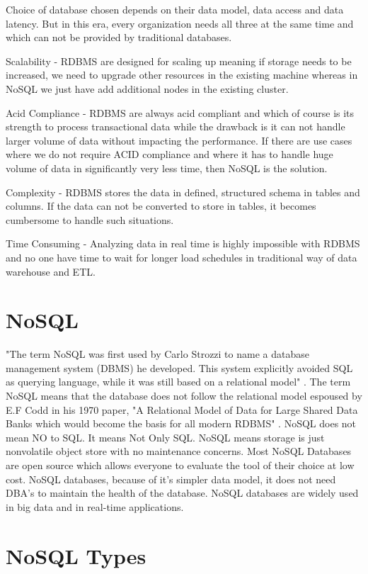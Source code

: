 \documentclass[sigconf]{acmart}
\begin{document}
Choice of database chosen depends on their data model, data access and data latency. But in this era, every organization needs all three at the same time and which can not be provided by traditional databases.

Scalability - RDBMS are designed for scaling up meaning if storage needs to be increased, we need to upgrade other resources in the existing machine whereas in NoSQL we just have add additional nodes in the existing cluster. 

Acid Compliance - RDBMS are always acid compliant and which of course is its strength to process transactional data while the drawback is it can not handle larger volume of data without impacting the performance. If there are use cases where we do not require ACID compliance and  where it has to handle huge volume of data in significantly very less time, then NoSQL is the solution.

Complexity - RDBMS stores the data in defined, structured schema in tables and columns. If the data can not be converted to store in tables, it becomes cumbersome to handle such situations. 

Time Consuming - Analyzing data in real time is highly impossible with RDBMS and no one have time to wait for longer load schedules in traditional way of data warehouse and ETL.

\section{NoSQL}

"The term NoSQL was first used by Carlo Strozzi to name a database management system (DBMS) he developed. This system explicitly avoided SQL as querying language, while it was still based on a relational model" \cite{seasupenn}. The term NoSQL means that the database does not follow the relational model espoused by E.F Codd in his 1970 paper, "A Relational Model of Data for Large Shared Data Banks which would become the basis for all modern RDBMS" \cite{rdbms}. NoSQL does not mean NO to SQL. It means Not Only SQL. NoSQL means storage is just nonvolatile object store with no maintenance concerns. Most NoSQL Databases are open source which allows everyone to evaluate the tool of their choice at low cost. NoSQL databases, because of it's simpler data model, it does not need DBA's to maintain the health of the database. NoSQL databases are widely used in big data and in real-time applications.  

\section{NoSQL Types}
\end{document}
